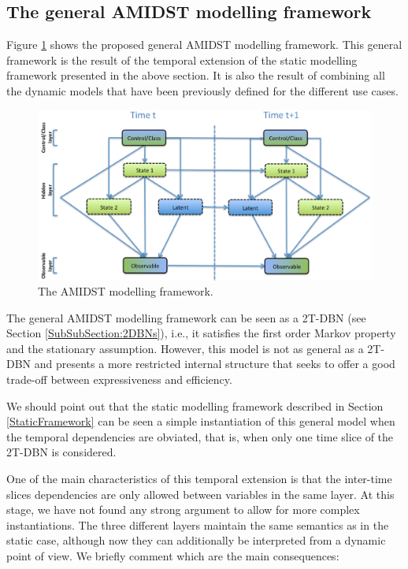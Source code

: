 \subsection{The general AMIDST modelling framework}\label{GeneralModelClass}

Figure \ref{Figure:AMIDSTModelClass} shows the proposed general AMIDST modelling framework. This general framework is the result of the temporal extension of the static modelling framework presented in the above section. It is also the result of combining all the dynamic models that have been previously defined for the different use cases. 

\begin{figure}[ht!]
\begin{center}
\includegraphics[scale=0.465]{./figures/AMIDSTModelClass}
\caption{\label{Figure:AMIDSTModelClass} The AMIDST modelling framework.}
\end{center}
\end{figure}

The general AMIDST modelling framework can be seen as a 2T-DBN (see Section \ref{SubSubSection:2DBNs}), i.e., it satisfies the first order Markov property and the stationary assumption. However, this model is not as general as a 2T-DBN and presents a more restricted internal structure that seeks to offer a good trade-off between expressiveness and efficiency. 

We should point out that the static modelling framework described in Section \ref{StaticFramework} can be seen a simple instantiation of this general model when the temporal dependencies are obviated, that is, when only one time slice of the 2T-DBN is considered. 

One of the main characteristics of this temporal extension is that the inter-time slices dependencies are only allowed between variables in the same layer. At this stage, we have not found any strong argument to allow for more complex instantiations. The three different layers maintain the same semantics as in the static case, although now they can additionally be interpreted from a dynamic point of view. We briefly comment which are the main consequences: 

